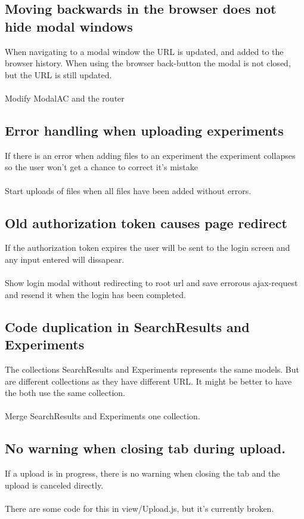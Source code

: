 \subsection{Moving backwards in the browser does not hide modal windows}
When navigating to a modal window the URL is updated, and added to the browser history. When using the browser back-button the modal is not closed, but the URL is still updated. \\
\\
 Modify ModalAC and the router
\subsection{Error handling when uploading experiments}
If there is an error when adding files to an experiment the experiment collapses so the user won't get a chance to correct it's mistake \\
\\
Start uploads of files when all files have been added without errors. 
\subsection{Old authorization token causes page redirect}
If the authorization token expires the user will be sent to the login screen and any input entered will dissapear. \\
\\
Show login modal without redirecting to root url and save errorous ajax-request and resend it when the login has been completed.
\subsection{Code duplication in SearchResults and Experiments}
The collections SearchResults and Experiments represents the same models. But are different collections as they have different URL. It might be better to have the both use the same collection. \\
\\
Merge SearchResults and Experiments one collection.
\subsection{No warning when closing tab during upload.}
If a upload is in progress, there is no warning when closing the tab and the upload is canceled directly. \\
\\
There are some code for this in view/Upload.js, but it's currently broken.
